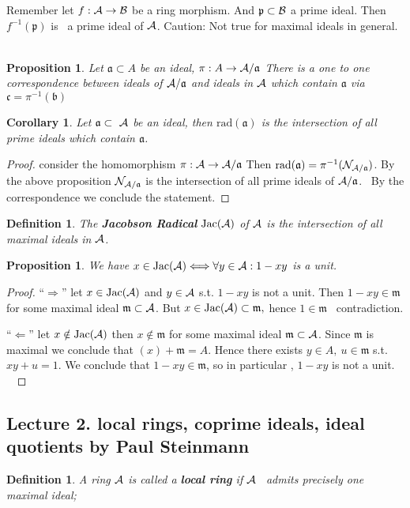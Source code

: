 \documentclass[11pt]{article}
\newtheorem{prop}[thm]{Proposition}
\newtheorem{cor}[thm]{Corollary}
\newtheorem{dfn}[thm]{Definition}
\newcommand{\sca}{{\mathfrak a}}
\newcommand{\scb}{{\mathfrak b}}
\newcommand{\scc}{{\mathfrak c}}
\newcommand{\scm}{{\mathfrak m}}
\newcommand{\scp}{{\mathfrak p}}
\newcommand{\cala}{{\cal A}}
\newcommand{\calb}{{\cal B}}
\newcommand{\caln}{{\cal N}}
\begin{document}
Remember let $f:\cala \rightarrow \calb$ be a ring morphism. And $\scp\subset \calb$ a prime ideal. 
Then $f^{-1}(\scp)$ is  a prime ideal of $\cala$.
Caution: Not true for maximal ideals in general. 
 
\begin{prop}
Let $\sca\subset A$ be an ideal, $\pi : A\rightarrow \cala/\sca$
There is a one to one correspondence between ideals of $\cala/\sca$ and ideals in $\cala$ which contain
$\sca$ via $\scc=\pi^{-1}(\scb)$
\end{prop}

\begin{cor}
Let $\sca\subset  \cala $ be an ideal, then $\text{rad}(\sca)$ is the intersection of all prime ideals which contain $\sca$.
\end{cor}
\begin{proof}
consider the homomorphism $\pi :\cala\rightarrow \cala/\sca$
Then $\text{rad}(\sca)=\pi^{-1}(\caln_{\cala/\sca})$.
By the above proposition $\caln_{\cala/\sca}$ is the intersection of all prime ideals of $\cala/\sca$.
 By the correspondence we conclude the statement.
\end{proof}
\begin{dfn}
 The \textbf{Jacobson Radical} $\text{Jac}(\cala)$ of $\cala$ is the intersection of all maximal ideals in $\cala$.
\end{dfn}
\begin{prop}\label{prop:criterion_jacobson_radical}
We have 
$x\in \text{Jac}(\cala)\Longleftrightarrow \forall y \in \cala: 1-xy $ is a unit.
\end{prop}
\begin{proof}
``$\Longrightarrow$'' let $x\in \text{Jac}(\cala)$ and $y\in \cala$ s.t. $1-xy$ is not a unit. Then $1-xy\in \scm$ for some maximal ideal 
$\scm \subset \cala$. But $x\in \text{Jac}(\cala)\subset \scm,$ hence $1\in \scm$  contradiction.

``$\Longleftarrow$'' let $x  \notin \text{Jac}(\cala)$ then $x \notin \scm$ for some maximal ideal $\scm\subset \cala$.
Since $\scm$ is maximal we conclude that $(x)+\scm=A$. Hence there exists $y\in A,\   u\in \scm$ s.t. $xy+u=1$.
We conclude that $1-xy \in \scm $, so in particular , $1-xy$ is not a unit.
 \end{proof}
\subsection{Lecture 2. local rings, coprime ideals, ideal quotients by Paul Steinmann}
\begin{dfn}
A ring $\cala$ is called a \textbf{local ring} if $\cala$  admits precisely one maximal ideal;
\end{dfn}
\end{document}
